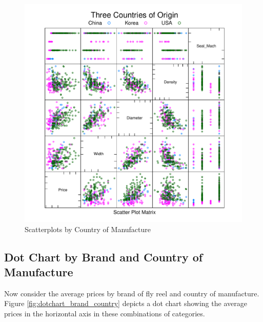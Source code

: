 \begin{figure}[h!]
  \centering
  \includegraphics[scale = 0.5, keepaspectratio=true]{../Figures/slpom_by_country}
  \caption{Scatterplots by Country of Manufacture} \label{fig:slpom_by_country}
\end{figure}



\pagebreak
\subsection{Dot Chart by Brand and Country of Manufacture}

Now consider the average prices by brand of fly reel and 
country of manufacture. 
Figure \ref{fig:dotchart_brand_country} depicts a dot chart
showing the average prices in the horizontal axis 
in these combinations of categories.


